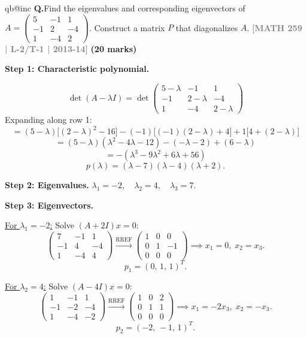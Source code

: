 \documentclass[12pt,a3paper]{article}
\makeatletter
\newcommand{\yr}[1]{\hfill\textcolor{gray}{\small\textbf{[#1]}}}
\newcommand{\mk}[1]{\textcolor{orange!70!black}{\small\textbf{(#1 marks)}}}
\newcounter{qnum}
\newcommand{\Q}[1]{%
  \csname qb@inc\endcsname
  \needspace{4\baselineskip}
  \refstepcounter{qnum}
  \vspace{6pt}
  \noindent\textbf{Q\theqnum.}\enspace #1\par
}
\makeatother
\begin{document}
\Q{Find the eigenvalues and corresponding eigenvectors of $A = \begin{pmatrix} 5 & -1 & 1 \\ -1 & 2 & -4 \\ 1 & -4 & 2 \end{pmatrix}$. Construct a matrix $P$ that diagonalizes $A$.
\yr{MATH 259 | L-2/T-1 | 2013-14} \mk{20}}

\begin{tcolorbox}[enhanced,breakable,
  colback=cE!4,colframe=cE,boxrule=0.8pt,arc=5pt,
  title={\textbf{Answer --- Eigenvalues, Eigenvectors \& Diagonalization}},
  fonttitle=\bfseries\color{white},colbacktitle=cE]

\textbf{Step 1: Characteristic polynomial.}

\[
\det(A-\lambda I)=\det\begin{pmatrix}5-\lambda&-1&1\\-1&2-\lambda&-4\\1&-4&2-\lambda\end{pmatrix}
\]
Expanding along row 1:
\[
=(5-\lambda)\bigl[(2-\lambda)^2-16\bigr]-(-1)\bigl[(-1)(2-\lambda)+4\bigr]+1\bigl[4+(2-\lambda)\bigr]
\]
\[
=(5-\lambda)(\lambda^2-4\lambda-12)-(-\lambda-2)+(6-\lambda)
\]
\[
=-({\lambda^3-9\lambda^2+6\lambda+56})
\]
\[
\boxed{p(\lambda)=(\lambda-7)(\lambda-4)(\lambda+2).}
\]

\textbf{Step 2: Eigenvalues.} $\lambda_1=-2,\quad\lambda_2=4,\quad\lambda_3=7$.

\medskip
\textbf{Step 3: Eigenvectors.}

\underline{For $\lambda_1=-2$:} Solve $(A+2I)x=0$:
\[
\begin{pmatrix}7&-1&1\\-1&4&-4\\1&-4&4\end{pmatrix}
\xrightarrow{\text{RREF}}
\begin{pmatrix}1&0&0\\0&1&-1\\0&0&0\end{pmatrix}
\implies x_1=0,\;x_2=x_3.
\]
\[
p_1=(0,\,1,\,1)^T.
\]

\underline{For $\lambda_2=4$:} Solve $(A-4I)x=0$:
\[
\begin{pmatrix}1&-1&1\\-1&-2&-4\\1&-4&-2\end{pmatrix}
\xrightarrow{\text{RREF}}
\begin{pmatrix}1&0&2\\0&1&1\\0&0&0\end{pmatrix}
\implies x_1=-2x_3,\;x_2=-x_3.
\]
\[
p_2=(-2,\,-1,\,1)^T.
\]


\end{tcolorbox}
\end{document}
